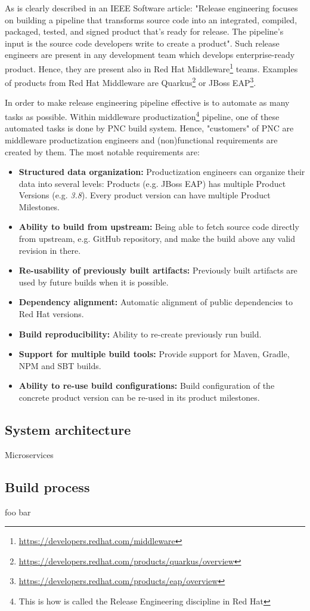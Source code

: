 \documentclass[../main.tex]{subfiles}
\begin{document}
As is clearly described in an IEEE Software article: "Release engineering focuses
on building a pipeline that transforms
source code into an integrated, compiled, packaged, tested, and signed
product that’s ready for release. The
pipeline’s input is the source code developers write to create a product"\cite{releaseEngineeringArticle}. Such release engineers are present in any development team which develops enterprise-ready product. Hence, they are present also in Red Hat Middleware\footnote{\url{https://developers.redhat.com/middleware}} teams. Examples of products from Red Hat Middleware are Quarkus\footnote{\url{https://developers.redhat.com/products/quarkus/overview}} or JBoss EAP\footnote{\url{https://developers.redhat.com/products/eap/overview}}.

In order to make release engineering pipeline effective is to automate as many tasks as possible. Within middleware productization\footnote{This is how is called the Release Engineering discipline in Red Hat} pipeline, one of these automated tasks is done by PNC build system. Hence, "customers" of PNC are middleware productization engineers and (non)functional requirements are created by them. The most notable requirements are:

\begin{itemize}
  \item \textbf{Structured data organization:} Productization engineers can
organize their data into several levels: Products (e.g. JBoss EAP) has multiple Product Versions (e.g. \textit{3.8}). Every product version can have multiple Product Milestones.

  \item \textbf{Ability to build from upstream:} Being able to fetch source code directly from upstream, e.g. GitHub repository, and make the build above any valid revision in there.

  \item \textbf{Re-usability of previously built artifacts:} Previously built artifacts are used by future builds when it is possible.

  \item \textbf{Dependency alignment:} Automatic alignment of public dependencies to Red Hat versions.

  \item \textbf{Build reproducibility:} Ability to re-create previously run build.

  \item \textbf{Support for multiple build tools:} Provide support for Maven, Gradle, NPM and SBT builds.

  \item \textbf{Ability to re-use build configurations:} Build configuration of the concrete product version can be re-used in its product milestones.

\end{itemize}

\subsection*{System architecture}
Microservices

\subsection*{Build process}
foo bar
\end{document}
